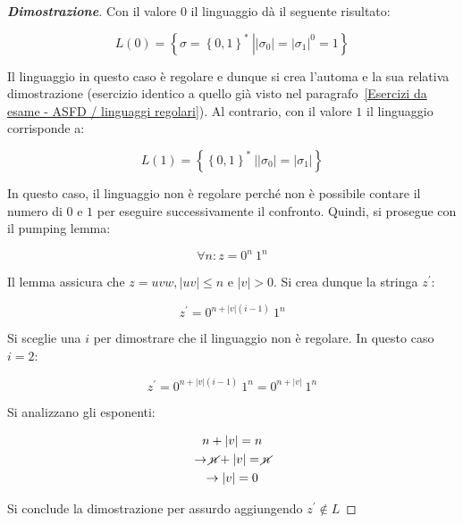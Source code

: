 \documentclass[a4paper]{article}
\begin{document}
	\begin{proof}[\textcolor{Blue3}{\textbf{Dimostrazione}}]
		Con il valore $0$ il linguaggio dà il seguente risultato:
		
		\begin{equation*}
			L\left(0\right) = \left\{\sigma = \left\{0,1\right\}^{*} \: \left| |\sigma_{0}| = |\sigma_{1}|^{0} = 1 \right.\right\}
		\end{equation*}
	
		\noindent
		Il linguaggio in questo caso è regolare e dunque si crea l'automa e la sua relativa dimostrazione (esercizio identico a quello già visto nel paragrafo~\ref{Esercizi da esame - ASFD / linguaggi regolari}). Al contrario, con il valore $1$ il linguaggio corrisponde a:
		
		\begin{equation*}
			L\left(1\right) = \left\{\left\{0,1\right\}^{*} \: \left| |\sigma_{0}| = |\sigma_{1}| \right.\right\}
		\end{equation*}
	
		\noindent
		In questo caso, il linguaggio non è regolare perché non è possibile contare il numero di $0$ e $1$ per eseguire successivamente il confronto. Quindi, si prosegue con il pumping lemma:
		
		\begin{equation*}
			\forall n : z = 0^{n} \: 1^{n}
		\end{equation*}
	
		\noindent
		Il lemma assicura che $z = uvw, |uv| \le n$ e $|v| > 0$. Si crea dunque la stringa $z^{'}$:
		
		\begin{equation*}
			z^{'} = 0^{n + |v|\left(i-1\right)} \: 1^{n}
		\end{equation*}
	
		\noindent
		Si sceglie una $i$ per dimostrare che il linguaggio non è regolare. In questo caso $i = 2$:
		
		\begin{equation*}
			z^{'} = 0^{n + |v|\left(i-1\right)} \: 1^{n} = 0^{n + |v|} \: 1^{n}
		\end{equation*}
	
		\noindent
		Si analizzano gli esponenti:
		
		\begin{gather*}
			n + |v| = n \\
			\rightarrow \cancel{n} + |v| = \cancel{n} \\
			\rightarrow |v| = 0
		\end{gather*}
	
		\noindent
		Si conclude la dimostrazione per assurdo aggiungendo $z^{'} \notin L$
	\end{proof}
\end{document}
